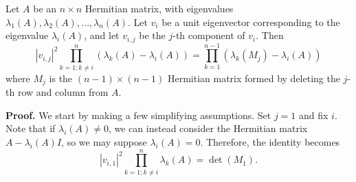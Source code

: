 \documentclass[12pt, letterpaper]{article}
\renewcommand{\l}{\lambda}
\begin{document}
\begin{tcolorbox}[colback=blue!5!white,colframe=blue!75!black]
    Let $A$ be an $n \times n$ Hermitian matrix, with eigenvalues $\l_1(A), \l_2(A), \dots, \l_n(A)$. Let $v_i$ be a unit eigenvector corresponding to the eigenvalue $\l_i(A)$, and let $v_{i,j}$ be the $j$-th component of $v_i$. Then
    \[
        |v_{i,j}|^2 \prod_{k = 1; k \neq i}^n (\l_k(A) - \l_i(A))
        = \prod_{k = 1}^{n-1}(\l_k(M_j) - \l_i(A))
    \]
    where $M_j$ is the $(n-1) \times (n-1)$ Hermitian matrix formed by deleting the $j$-th row and column from $A$.
\end{tcolorbox}

\textbf{Proof.} We start by making a few simplifying assumptions. Set $j = 1$ and fix $i$. Note that if $\l_i(A) \neq 0$, we can instead consider the Hermitian matrix $A - \l_i(A)I$, so we may suppose $\l_i(A) = 0$. Therefore, the identity becomes
\[
    |v_{i,1}|^2 \prod_{k = 1; k \neq i}^n \l_k(A)
    = \det(M_1). 
\]
\end{document}
